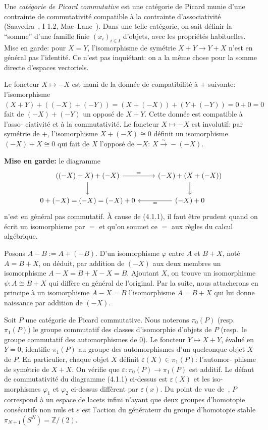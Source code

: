\documentclass[12pt,a4paper]{article}
\theoremstyle{plain}
\theoremstyle{definition}
\newcommand{\ZZ}{\mathbb{Z}}
\begin{document}
Une \emph{cat\'egorie de Picard commutative} est une cat\'egorie de Picard munie d'une
contrainte de commutativit\'e compatible \`a la contrainte d'associativit\'e (Saavedra~\cite{15}, I 1.2, Mac~Lane~\cite{11}). Dans une telle cat\'egorie, on sait d\'efinir la ``somme''
d'une famille finie $(x_i)_{i \in I}$ d'objets, avec les propri\'et\'es habituelles. Mise
en garde: pour $X = Y$, l'isomorphisme de sym\'etrie $X + Y \to Y + X$ n'est en g\'en\'eral
pas l'identit\'e. Ce n'est pas inqui\'etant: on a la m\^eme chose pour la somme directe
d'espaces vectoriels.

Le foncteur $X \mapsto -X$ est muni de la donn\'ee de compatibilit\'e \`a $+$ suivante:
l'isomorphisme $(X + Y) + ((-X) + (-Y)) = (X + (-X)) + (Y + (-Y)) = 0 + 0 = 0$
fait de $(-X) + (-Y)$ un oppos\'e de $X + Y$. Cette donn\'ee est compatible \`a l'asso-
ciativit\'e et \`a la commutativit\'e. Le foncteur $X \mapsto -X$ est involutif: par sym\'etrie
de $+$, l'isomorphisme $X + (-X) \cong 0$ d\'efinit un isomorphisme $(-X) + X \cong 0$ qui
fait de $X$ l'oppos\'e de $-X$: $X \xrightarrow{\sim} -(-X)$.

\textbf{Mise en garde:} le diagramme
\begin{equation}\label{eq:4.1.1}
\begin{tikzcd}
((-X) + X) + (-X) \arrow[r, "="] \arrow[d] & (-X) + (X + (-X)) \arrow[d] \\
0 + (-X) = (-X) = (-X) + 0 & (-X) + 0 \arrow[l, "="]
\end{tikzcd}
\end{equation}
n'est en g\'en\'eral pas commutatif. \`A cause de (4.1.1), il faut \^etre prudent quand
on \'ecrit un isomorphisme par $=$ et qu'on soumet ce $=$ aux r\`egles du calcul alg\'ebrique.

Posons $A - B := A + (-B)$. D'un isomorphisme $\varphi$ entre $A$ et $B + X$, not\'e
$A = B + X$, on d\'eduit, par addition de $(-X)$ aux deux membres un isomorphisme
$A - X = B + X - X = B$. Ajoutant $X$, on trouve un isomorphisme $\psi: A \cong B + X$
qui diff\`ere en g\'en\'eral de l'original. Par la suite, nous attacherons en principe
\`a un isomorphisme $A - X = B$ l'isomorphisme $A = B + X$ qui lui donne naissance
par addition de $(-X)$.

Soit $P$ une cat\'egorie de Picard commutative. Nous noterons $\pi_0(P)$ (resp.\ $\pi_1(P)$) le groupe commutatif des classes d'isomorphie d'objets de $P$ (resp.\ le
groupe commutatif des automorphismes de $0$). Le foncteur $Y \mapsto X + Y$, \'evalu\'e
en $Y = 0$, identifie $\pi_1(P)$ au groupe des automorphismes d'un quelconque objet
$X$ de $P$. En particulier, chaque objet $X$ d\'efinit $\varepsilon(X) \in \pi_1(P)$: l'automor-
phisme de sym\'etrie de $X + X$. On v\'erifie que $\varepsilon: \pi_0(P) \to \pi_1(P)$ est additif.
Le d\'efaut de commutativit\'e du diagramme (4.1.1) ci-dessus est $\varepsilon(X)$ et les iso-
morphismes $\varphi_1$ et $\varphi_2$ ci-dessus diff\`erent par $\varepsilon(x)$. Du point de vue de~\cite{9},
$P$ correspond \`a un espace de lacets infini n'ayant que deux groupes d'homotopie
cons\'ecutifs non nuls et $\varepsilon$ est l'action du g\'en\'erateur du groupe d'homotopie stable
$\pi_{N+1}(S^N) = \ZZ/(2)$.
\end{document}
